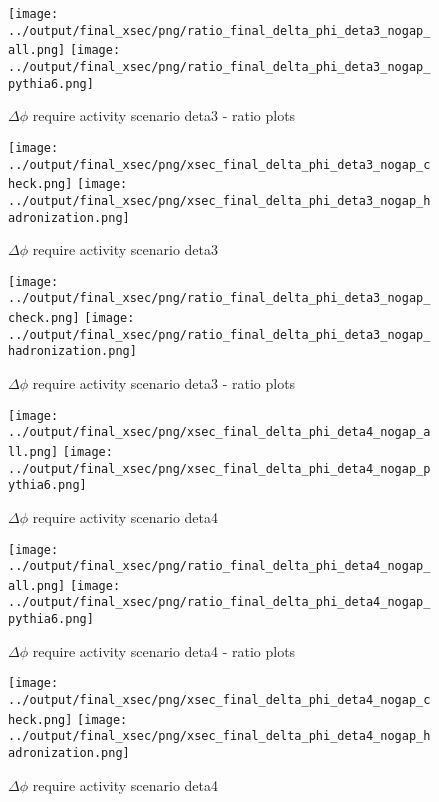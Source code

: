 \documentclass[11pt]{article}
\begin{document}
\begin{figure}[ht]
\centering
\texttt{[image: ../output/final\_xsec/png/ratio\_final\_delta\_phi\_deta3\_nogap\_all.png]}
\texttt{[image: ../output/final\_xsec/png/ratio\_final\_delta\_phi\_deta3\_nogap\_pythia6.png]}
\caption{$\Delta\phi$ require activity scenario deta3 - ratio plots}
\label{fig:delta_phi_deta3_nogap_ratio}
\end{figure}

\begin{figure}[ht]
\centering
\texttt{[image: ../output/final\_xsec/png/xsec\_final\_delta\_phi\_deta3\_nogap\_check.png]}
\texttt{[image: ../output/final\_xsec/png/xsec\_final\_delta\_phi\_deta3\_nogap\_hadronization.png]}
\caption{$\Delta\phi$ require activity scenario deta3}
\label{fig:delta_phi_deta3_nogapb}
\end{figure}

\begin{figure}[ht]
\centering
\texttt{[image: ../output/final\_xsec/png/ratio\_final\_delta\_phi\_deta3\_nogap\_check.png]}
\texttt{[image: ../output/final\_xsec/png/ratio\_final\_delta\_phi\_deta3\_nogap\_hadronization.png]}
\caption{$\Delta\phi$ require activity scenario deta3 - ratio plots}
\label{fig:delta_phi_deta3_nogapb_ratio}
\end{figure}


\begin{figure}[ht]
\centering
\texttt{[image: ../output/final\_xsec/png/xsec\_final\_delta\_phi\_deta4\_nogap\_all.png]}
\texttt{[image: ../output/final\_xsec/png/xsec\_final\_delta\_phi\_deta4\_nogap\_pythia6.png]}
\caption{$\Delta\phi$ require activity scenario deta4}
\label{fig:delta_phi_deta4_nogap}
\end{figure}

\begin{figure}[ht]
\centering
\texttt{[image: ../output/final\_xsec/png/ratio\_final\_delta\_phi\_deta4\_nogap\_all.png]}
\texttt{[image: ../output/final\_xsec/png/ratio\_final\_delta\_phi\_deta4\_nogap\_pythia6.png]}
\caption{$\Delta\phi$ require activity scenario deta4 - ratio plots}
\label{fig:delta_phi_deta4_nogap_ratio}
\end{figure}

\begin{figure}[ht]
\centering
\texttt{[image: ../output/final\_xsec/png/xsec\_final\_delta\_phi\_deta4\_nogap\_check.png]}
\texttt{[image: ../output/final\_xsec/png/xsec\_final\_delta\_phi\_deta4\_nogap\_hadronization.png]}
\caption{$\Delta\phi$ require activity scenario deta4}
\label{fig:delta_phi_deta4_nogapb}
\end{figure}
\end{document}
